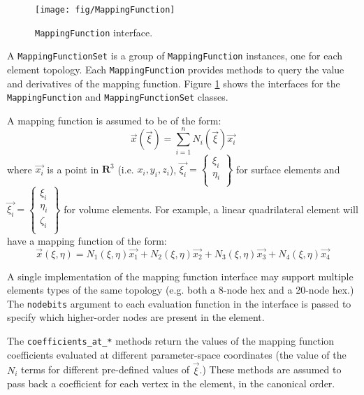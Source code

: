 \documentclass{article}
\begin{document}
\begin{figure}[htb]
\begin{center}
\texttt{[image: fig/MappingFunction]}
\caption{\texttt{MappingFunction} interface.\label{fig:MappingFunction}}
\end{center}
\end{figure}

A \texttt{MappingFunctionSet} is a group of \texttt{MappingFunction} instances, one for each element topology.  Each \texttt{MappingFunction} provides methods to query the value and derivatives of the mapping function.  Figure \ref{fig:MappingFunction} shows the interfaces for the \texttt{MappingFunction} and \texttt{MappingFunctionSet} classes.

A mapping function is assumed to be of the form:
\begin{displaymath}
\vec{x}(\vec{\xi})=\sum_{i=1}^n N_i(\vec{\xi})\vec{x_i}
\end{displaymath}
where $\vec{x_i}$ is a point in $\mathbf{R}^3$ (i.e. $x_i,y_i,z_i$), $\vec{\xi_i} = \left\{\begin{array}{c}\xi_i\\ \eta_i\\ \end{array}\right\}$ for surface elements and $\vec{\xi_i} = \left\{\begin{array}{c}\xi_i\\ \eta_i\\ \zeta_i\\ \end{array}\right\}$ for volume elements.  For example,  a linear quadrilateral element will have a mapping function of the form:
\begin{displaymath}
\vec{x}(\xi,\eta)=N_1(\xi,\eta)\vec{x_1}
                      +N_2(\xi,\eta)\vec{x_2}
                      +N_3(\xi,\eta)\vec{x_3}
                      +N_4(\xi,\eta)\vec{x_4}
\end{displaymath}

A single implementation of the mapping function interface may support multiple elements types of the same topology (e.g. both a 8-node hex and a 20-node hex.)  The \texttt{nodebits} argument to each evaluation function in the interface is passed to specify which higher-order nodes are present in the element.  

The \texttt{coefficients\_at\_*} methods return the values of the mapping function coefficients evaluated at different parameter-space coordinates (the value of the $N_i$ terms for different pre-defined values of $\vec{\xi}$.)  These methods are assumed to pass back a coefficient for each vertex in the element, in the canonical order.
\end{document}
